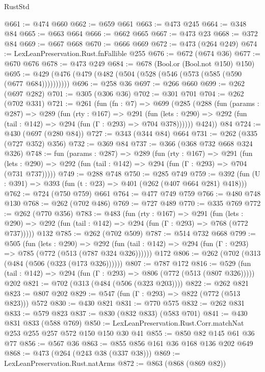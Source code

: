 \begin{lexlean}{RustStd}
\begin{coremodule}
@661 := @474 @660
@662 := @659 @661
@663 := @473 @245
@664 := @348 @84
@665 := @663 @664
@666 := @662 @665
@667 := @473 @23
@668 := @372 @84
@669 := @667 @668
@670 := @666 @669
@672 := @473 (@264 @249)
@674 := LexLeanPreservation.Rust.fnFallible @255
@676 := @672 (@674 @36)
@677 := @670 @676
@678 := @473 @249
@684 := @678 (Bool.or (Bool.not @150) @150)
@695 := @429 (@476 (@479 (@482 (@504 (@528 (@546 (@573 (@585 (@590 (@677 @684))))))))))
@696 := @258 @36
@697 := @266 @660
@699 := @262 (@697 @282)
@701 := @305 (@306 @36)
@702 := @301 @701
@704 := @262 (@702 @331)
@721 := @261
    (fun (fn : @7) =>
    @699
      (@285
        (@288
          (fun (params : @287) =>
          @289
            (fun (rty : @167) =>
            @291
              (fun (lets : @290) =>
              @292 (fun (tail : @142) => @294 (fun (Γ : @293) => @704 @378))))))
        @424))
    @84
@724 := @430 (@697 (@280 @84))
@727 := @343 (@344 @84) @664
@731 := @262 (@335 (@727 @352) @356)
@732 := @369 @84
@737 := @366 (@368 @732 @668 @324 @326)
@748 := fun (params : @287) =>
  @289
    (fun (rty : @167) =>
    @291
      (fun (lets : @290) => @292 (fun (tail : @142) => @294 (fun (Γ : @293) => @704 (@731 @737)))))
@749 := @288 @748
@750 := @285 @749
@759 := @392 (fun (U : @391) => @393 (fun (t : @23) => @401 (@262 (@407 @664 @281) @418)))
@762 := @724 (@750 @759) @661
@764 := @477 @749 @759
@766 := @480 @748 @130
@768 := @262 (@702 @486)
@769 := @727 @489
@770 := @335 @769
@772 := @262 (@770 @356)
@783 := @483
    (fun (rty : @167) =>
    @291
      (fun (lets : @290) => @292 (fun (tail : @142) => @294 (fun (Γ : @293) => @768 (@772 @737)))))
    @132
@785 := @262 (@702 @509)
@787 := @514 @732 @668
@799 := @505
    (fun (lets : @290) =>
    @292 (fun (tail : @142) => @294 (fun (Γ : @293) => @785 (@772 (@513 (@787 @324 @326))))))
    @172
@806 := @262 (@702 (@313 (@484 (@506 (@323 (@173 @326))))))
@807 := @787 @172
@816 := @529 (fun (tail : @142) => @294 (fun (Γ : @293) => @806 (@772 (@513 (@807 @326))))) @202
@821 := @702 (@313 (@484 (@506 (@323 @203))))
@822 := @262 @821
@823 := @807 @202
@829 := @547 (fun (Γ : @293) => @822 (@772 (@513 @823))) @572
@830 := @430 @821
@831 := @770 @575
@832 := @262 @831
@833 := @579 @823
@837 := @830 (@832 @833) (@583 @701)
@841 := @430 @831 @833 (@588 @769)
@850 := LexLeanPreservation.Rust.Corr.matchNat @253 @255 @257 @572 @150 @150 @30 @41
@855 := @850 @82 @145 @61 @36 @77
@856 := @567 @36
@863 := @855 @856 @161 @36 @168 @136 @202 @649
@868 := @473 (@264 (@243 @38 (@337 @38)))
@869 := LexLeanPreservation.Rust.natArms
@872 := @863 (@868 (@869 @82))

\end{coremodule}
\end{lexlean}
